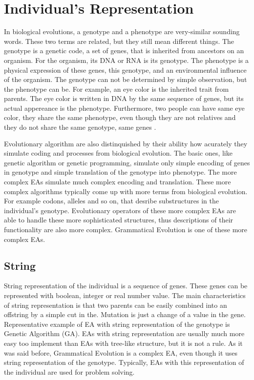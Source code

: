 
\section{Individual's Representation}
In biological evolutions, a genotype and a phenotype are very-similar sounding words. These two terms are related, but they still mean different things.
The genotype is a genetic code, a set of genes, that is inherited from ancestors on an organism. For the organism, its DNA or RNA is its genotype.
The phenotype is a physical expression of these genes, this genotype, and an environmental influence of the organism.
The genotype can not be determined by simple observation, but the phenotype can be. For example, an eye color is the inherited trait from parents. The eye color is written in DNA by the same sequence of genes, but its actual appereance is the phenotype. Furthermore, two people can have same eye color, they share the same phenotype, even though they are not relatives and they do not share the same genotype, same genes \cite{genotype-phenotype}.

Evolutionary algorithm are also distinquished by their ability how acurately they simulate coding and processes from biological evolution. The basic ones, like genetic algorithm or genetic programming, simulate only simple encoding of genes in genotype and simple translation of the genotype into phenotype. The more complex EAs simulate much complex encoding and translation. These more complex algorithms typically come up with more terms from biological evolution. For example codons, alleles and so on, that desribe substructures in the individual's genotype. Evolutionary operators of these more complex EAs are able to handle these more sophisticated structures, thus descriptions of their functionality are also more complex. Grammatical Evolution is one of these more complex EAs.

\subsection{String}
String representation of the individual is a sequence of genes. These genes can be represented with boolean, integer or real number value.
The main characteristics of string representation is that two parents can be easily combined into an offstring by a simple cut in the. Mutation is just a change of a value in the gene. Representative example of EA with string representation of the genotype is Genetic Algorithm (GA). EAs with string representation are usually much more easy too implement than EAs with tree-like structure, but it is not a rule. As it was said before, Grammatical Evolution is a complex EA, even though it uses string representation of the genotype. Typically, EAs with this representation of the individual are used for problem solving.


